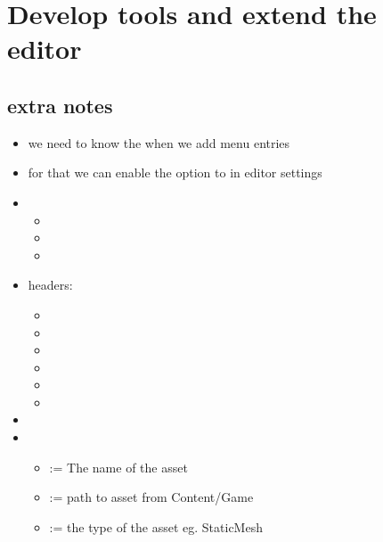 \chapter{Develop tools and extend the editor}
    \section{extra notes}
        \begin{itemize}
            \item we need to know the  when we add menu entries
            \item for that we can enable the option to  in editor settings
            \item 
            \begin{itemize}
                \item {}
				\item {}
                \item {}
            \end{itemize}
            \item headers:
            \begin{itemize}
                \item {}
                \item {}
                \item {}
                \item {}
                \item {}
                \item \code{}
            \end{itemize}
            \item 
            \item {}
            \begin{itemize}
                \item {} := The name of the asset
                \item {} := path to asset from Content/Game
                \item {} := the type of the asset eg. \glqq StaticMesh\grqq
            \\ \end{itemize}

\end{itemize}
